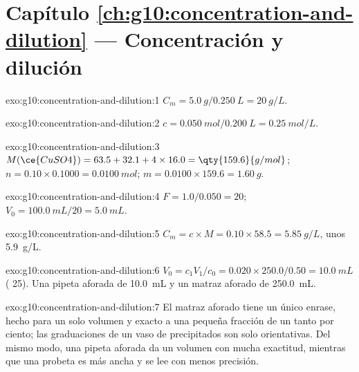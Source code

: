 \section*{Capítulo \ref{ch:g10:concentration-and-dilution} --- Concentración y dilución}

\begin{solution}{exo:g10:concentration-and-dilution:1}
$C_m = \qty{5.0}{g} / \qty{0.250}{L} = \qty{20}{g/L}$.
\end{solution}

\begin{solution}{exo:g10:concentration-and-dilution:2}
$c = \qty{0.050}{mol} / \qty{0.200}{L} = \qty{0.25}{mol/L}$.
\end{solution}

\begin{solution}{exo:g10:concentration-and-dilution:3}
$M(\ce{CuSO4}) = 63.5 + 32.1 + 4 \times 16.0 = \qty{159.6}{g/mol}$;
$n = 0.10 \times 0.1000 = \qty{0.0100}{mol}$; $m = 0.0100 \times 159.6 =
\qty{1.60}{g}$.
\end{solution}

\begin{solution}{exo:g10:concentration-and-dilution:4}
$F = 1.0 / 0.050 = 20$; $V_0 = \qty{100.0}{mL} / 20 = \qty{5.0}{mL}$.
\end{solution}

\begin{solution}{exo:g10:concentration-and-dilution:5}
$C_m = c \times M = 0.10 \times 58.5 = \qty{5.85}{g/L}$, unos
\qty{5.9}{g/L}.
\end{solution}

\begin{solution}{exo:g10:concentration-and-dilution:6}
$V_0 = c_1 V_1 / c_0 = 0.020 \times 250.0 / 0.50 = \qty{10.0}{mL}$
( 25). Una pipeta aforada de \qty{10.0}{mL} y un
matraz aforado de \qty{250.0}{mL}.
\end{solution}

\begin{solution}{exo:g10:concentration-and-dilution:7}
El matraz aforado tiene un único enrase, hecho para un solo volumen y
exacto a una pequeña fracción de un tanto por ciento; las graduaciones
de un vaso de precipitados son solo orientativas. Del mismo modo, una
pipeta aforada da un volumen con mucha exactitud, mientras que una
probeta es más ancha y se lee con menos precisión.
\end{solution}

